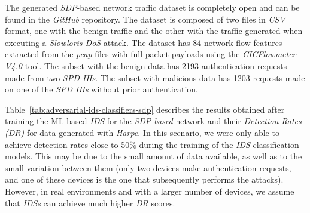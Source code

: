 The generated \textit{SDP}-based network traffic dataset is completely open and can be found in the
\textit{GitHub} repository.
The dataset is composed of two files in \textit{CSV} format, one with the benign traffic and the other with the traffic
generated when executing a \textit{Slowloris DoS} attack.
The dataset has 84 network flow features extracted from the \textit{pcap} files with full packet payloads using the
\textit{CICFlowmeter-V4.0} tool.
The subset with the benign data has 2193 authentication requests made from two \textit{SPD IHs}.
The subset with malicious data has 1203 requests made on one of the \textit{SPD IHs} without prior authentication.

Table~\ref{tab:adversarial-ids-classifiers-sdp} describes the results obtained after training the ML-based \textit{IDS}
for the \textit{SDP-based} network and their \textit{Detection Rates (DR)} for data generated with \textit{Harpe}.
In this scenario, we were only able to achieve detection rates close to 50\% during the training of the \textit{IDS}
classification models.
This may be due to the small amount of data available, as well as to the small variation between them (only two devices
make authentication requests, and one of these devices is the one that subsequently performs the attacks).
However, in real environments and with a larger number of devices, we assume that \textit{IDSs} can achieve much higher
\textit{DR} scores.

\begin{table}[t]
    \caption{Performance of the \textit{IDSs} classifiers with adversarial traffic on the generated \textit{SDP}-based network dataset.}
    \label{tab:adversarial-ids-classifiers-sdp}
\end{table}

